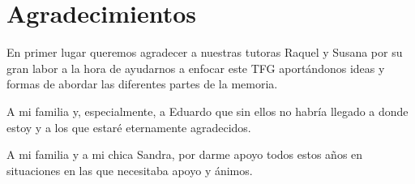 
\chapter*{Agradecimientos}

En primer lugar queremos agradecer a nuestras tutoras Raquel y Susana por su gran labor a la hora de ayudarnos a enfocar este TFG aportándonos ideas y formas de abordar las diferentes partes de la memoria.

\setlength{\parskip}{10pt}
A mi familia y, especialmente, a Eduardo que sin ellos no habría llegado a donde estoy y a los que estaré eternamente agradecidos.



\setlength{\parskip}{10pt}
A mi familia y a mi chica Sandra, por darme apoyo todos estos años en situaciones en las que necesitaba apoyo y ánimos.













